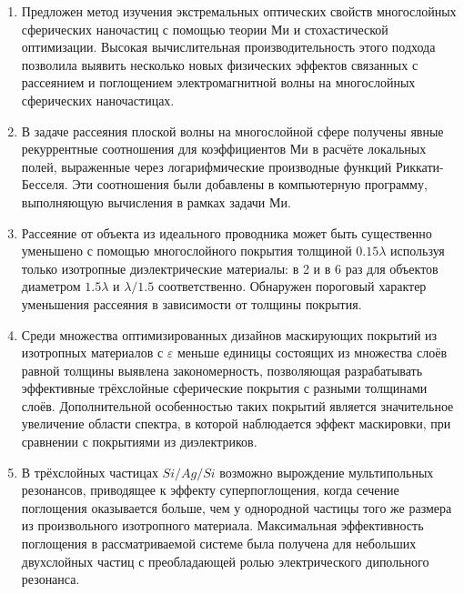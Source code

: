\begin{enumerate}
  \item Предложен метод изучения экстремальных оптических свойств
    многослойных сферических наночастиц с помощью теории Ми и
    стохастической оптимизации. Высокая вычислительная
    производительность этого подхода позволила выявить несколько новых
    физических эффектов связанных с рассеянием и поглощением
    электромагнитной волны на многослойных сферических наночастицах.
  \item В задаче рассеяния плоской волны на многослойной сфере
    получены явные рекуррентные соотношения для коэффициентов Ми в
    расчёте локальных полей, выраженные через логарифмические
    производные функций Риккати-Бесселя.  Эти соотношения были
    добавлены в компьютерную программу, выполняющую вычисления в
    рамках задачи Ми.
  \item Рассеяние от объекта из идеального проводника может быть
    существенно уменьшено с помощью многослойного покрытия толщиной
    $0.15\lambda$ используя только изотропные диэлектрические
    материалы: в 2 и в 6 раз для объектов диаметром $1.5\lambda$ и
    $\lambda/1.5$ соответственно. Обнаружен пороговый характер
    уменьшения рассеяния в зависимости от толщины покрытия.
  \item %
    Среди множества оптимизированных дизайнов маскирующих покрытий из
    изотропных материалов с $\varepsilon$ меньше единицы состоящих из
    множества слоёв равной толщины выявлена закономерность,
    позволяющая разрабатывать эффективные трёхслойные сферические
    покрытия с разными толщинами слоёв. Дополнительной особенностью
    таких покрытий является значительное увеличение области спектра, в
    которой наблюдается эффект маскировки, при сравнении с покрытиями
    из диэлектриков. 
  \item В трёхслойных частицах $Si/Ag/Si$ возможно вырождение
    мультипольных резонансов, приводящее к эффекту суперпоглощения,
    когда сечение поглощения оказывается больше, чем у однородной
    частицы того же размера из произвольного изотропного
    материала. Максимальная эффективность поглощения в
    рассматриваемой системе была получена для небольших двухслойных
    частиц с преобладающей ролью электрического дипольного резонанса.
\end{enumerate}
